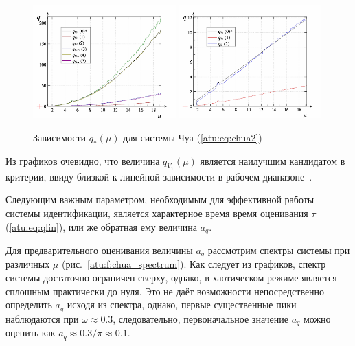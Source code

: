 \begin{figure}[htb!]
\centerline{
  \includegraphics[width=0.49\textwidth]{p/cha/chua/chua_q-p_mu2.png}
  \includegraphics[width=0.49\textwidth]{p/cha/chua/chua_q-p_mu1.png}
}
  \caption{Зависимости $q_{*}(\mu) $ для системы Чуа (\ref{atu:eq:chua2})}
\label{atu:f:chua_q}
\end{figure}

Из графиков очевидно, что величина $ q_{V_1}(\mu) $
является наилучшим кандидатом в критерии, ввиду близкой к линейной зависимости
в рабочем диапазоне~\cite{atu_apir2011}.

Следующим важным параметром, необходимым для эффективной работы системы идентификации, является
характерное время время оценивания $\tau$ (\ref{atu:eq:qlin}), или же обратная ему величина $a_q$.

Для предварительного оценивания величины $a_q$ рассмотрим спектры системы при различных
$\mu$ (рис.~\ref{atu:f:chua_spectrum}). Как следует из графиков, спектр системы достаточно
ограничен сверху, однако, в хаотическом режиме является сплошным практически до нуля.
Это не даёт возможности непосредственно определить $a_q$ исходя из спектра,
однако, первые существенные пики наблюдаются при $ \omega \approx 0.3 $, следовательно,
первоначальное значение $a_q$ можно оценить как $ a_q \approx 0.3 / \pi \approx 0.1 $.


